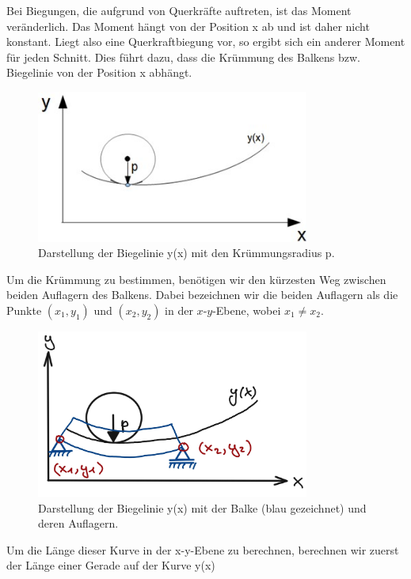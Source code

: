 Bei Biegungen, die aufgrund von Querkräfte auftreten, ist das Moment veränderlich.
Das Moment hängt von der Position x ab und ist daher nicht konstant.
Liegt also eine Querkraftbiegung vor, so ergibt sich ein anderer Moment für jeden Schnitt.
Dies führt dazu, dass die Krümmung des Balkens bzw. Biegelinie von der Position x abhängt.
\begin{figure}
\begin{center}
	\includegraphics[width=0.8\textwidth]{papers/balken/images/teil2/BiegungBalke1.jpg}
\end{center}
\caption{Darstellung der Biegelinie y(x) mit den Krümmungsradius p.}
\end{figure}
Um die Krümmung zu bestimmen, benötigen wir den kürzesten Weg zwischen beiden Auflagern des Balkens.
Dabei bezeichnen wir die beiden Auflagern als die Punkte $(x_1, y_1)$ und $(x_2, y_2)$ in der $x$-$y$-Ebene, wobei $x_1 \ne x_2$.
\begin{figure}
\begin{center}
	\includegraphics[width=0.8\textwidth]{papers/balken/images/teil2/BiegungBalke2.jpg}
\end{center}
\caption{Darstellung der Biegelinie y(x) mit der Balke (blau gezeichnet) und deren Auflagern.}
\end{figure}
Um die Länge dieser Kurve in der x-y-Ebene zu berechnen, berechnen wir zuerst der Länge einer Gerade auf der Kurve y(x)
